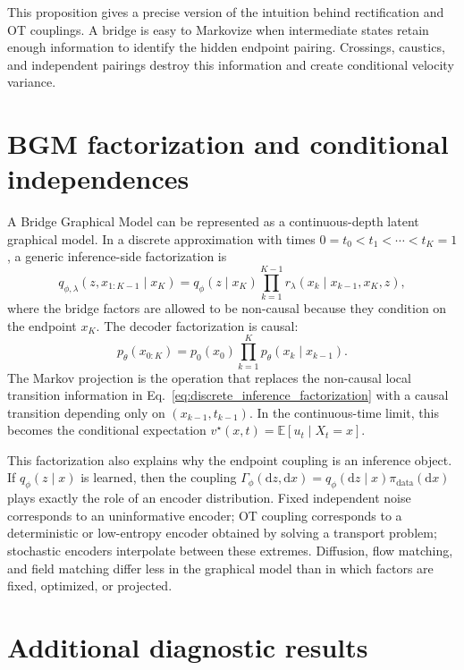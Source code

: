 \documentclass{article}
\numberwithin{equation}{section}
\newcommand{\E}{\mathbb{E}}
\newcommand{\dd}{\mathrm{d}}
\newcommand{\pdata}{\pi_{\mathrm{data}}}
\begin{document}
This proposition gives a precise version of the intuition behind rectification and OT couplings. A bridge is easy to Markovize when intermediate states retain enough information to identify the hidden endpoint pairing. Crossings, caustics, and independent pairings destroy this information and create conditional velocity variance.

\section{BGM factorization and conditional independences}
\label{app:graphical_factorization}

A Bridge Graphical Model can be represented as a continuous-depth latent graphical model. In a discrete approximation with times \(0=t_0<t_1<\cdots<t_K=1\), a generic inference-side factorization is
\begin{equation}
    q_{\phi,\lambda}(z,x_{1:K-1}\mid x_K)
    =q_\phi(z\mid x_K)\prod_{k=1}^{K-1} r_\lambda(x_k\mid x_{k-1},x_K,z),
    \label{eq:discrete_inference_factorization}
\end{equation}
where the bridge factors are allowed to be non-causal because they condition on the endpoint \(x_K\). The decoder factorization is causal:
\begin{equation}
    p_\theta(x_{0:K})=p_0(x_0)\prod_{k=1}^{K}p_\theta(x_k\mid x_{k-1}).
    \label{eq:discrete_decoder_factorization}
\end{equation}
The Markov projection is the operation that replaces the non-causal local transition information in Eq.~\eqref{eq:discrete_inference_factorization} with a causal transition depending only on \((x_{k-1},t_{k-1})\). In the continuous-time limit, this becomes the conditional expectation \(v^\star(x,t)=\E[u_t\mid X_t=x]\).

This factorization also explains why the endpoint coupling is an inference object. If \(q_\phi(z\mid x)\) is learned, then the coupling \(\Gamma_\phi(\dd z,\dd x)=q_\phi(\dd z\mid x)\pdata(\dd x)\) plays exactly the role of an encoder distribution. Fixed independent noise corresponds to an uninformative encoder; OT coupling corresponds to a deterministic or low-entropy encoder obtained by solving a transport problem; stochastic encoders interpolate between these extremes. Diffusion, flow matching, and field matching differ less in the graphical model than in which factors are fixed, optimized, or projected.

\section{Additional diagnostic results}
\label{app:additional_diagnostics}
\end{document}
